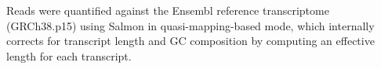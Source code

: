 %
Reads were quantified against the Ensembl reference transcriptome (GRCh38.p15) using Salmon \autocite{patro2017SalmonProvidesFast} in quasi-mapping-based mode, 
which internally corrects for transcript length and GC composition by computing an effective length for each transcript.
